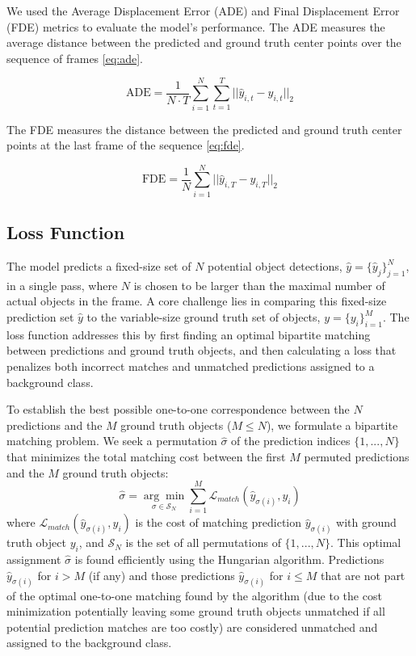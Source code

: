 We used the Average Displacement Error (ADE) and Final Displacement Error (FDE) metrics to evaluate the model's performance. The ADE measures the average distance between the predicted and ground truth center points over the sequence of frames \ref{eq:ade}.

\begin{equation}
    \text{ADE} = \frac{1}{N \cdot T} \sum_{i=1}^{N} \sum_{t=1}^{T} || \hat{y}_{i,t} - y_{i,t} ||_2
    \label{eq:ade}
\end{equation}

The FDE measures the distance between the predicted and ground truth center points at the last frame of the sequence \ref{eq:fde}.

\begin{equation}
    \text{FDE} = \frac{1}{N} \sum_{i=1}^{N} || \hat{y}_{i,T} - y_{i,T} ||_2
    \label{eq:fde}
\end{equation}
\subsection{Loss Function} \label{Methods:LossFunction}

The model predicts a fixed-size set of $N$ potential object detections, $ \hat{y} = \{\hat{y}_j\}_{j=1}^N $, in a single pass, where $N$ is chosen to be larger than the maximal number of actual objects in the frame. A core challenge lies in comparing this fixed-size prediction set $ \hat{y} $ to the variable-size ground truth set of objects, $ y = \{y_i\}_{i=1}^M $. The loss function addresses this by first finding an optimal bipartite matching between predictions and ground truth objects, and then calculating a loss that penalizes both incorrect matches and unmatched predictions assigned to a background class.

To establish the best possible one-to-one correspondence between the $N$ predictions and the $M$ ground truth objects ($M \le N$), we formulate a bipartite matching problem. We seek a permutation $ \hat{\sigma} $ of the prediction indices $ \{1, ..., N\} $ that minimizes the total matching cost between the first $M$ permuted predictions and the $M$ ground truth objects:
\begin{equation}
    \hat{\sigma} = \underset{\sigma \in \mathcal{S}_N}{\arg\min} \sum_{i=1}^M \mathcal{L}_{match}(\hat{y}_{\sigma(i)}, y_i)
    \label{eq:matching_argmin}
\end{equation}
where $ \mathcal{L}_{match}(\hat{y}_{\sigma(i)}, y_i) $ is the cost of matching prediction $ \hat{y}_{\sigma(i)} $ with ground truth object $ y_i $, and $ \mathcal{S}_N $ is the set of all permutations of $ \{1, ..., N\} $. This optimal assignment $ \hat{\sigma} $ is found efficiently using the Hungarian algorithm. Predictions $ \hat{y}_{\sigma(i)} $ for $ i > M $ (if any) and those predictions $ \hat{y}_{\sigma(i)} $ for $ i \le M $ that are not part of the optimal one-to-one matching found by the algorithm (due to the cost minimization potentially leaving some ground truth objects unmatched if all potential prediction matches are too costly) are considered unmatched and assigned to the background class.

